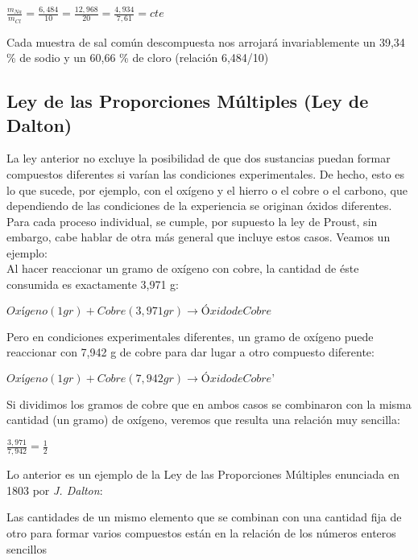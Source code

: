 \begin{center}
		$\frac{m_{Na}}{m_{Cl}}=\frac{6,484}{10}=\frac{12,968}{20}=\frac{4,934}{7,61}=cte$
\end{center}

Cada muestra de sal común descompuesta nos arrojará invariablemente un 39,34 \% de sodio y un 60,66 \% de cloro (relación 6,484/10)

\subsection{Ley de las Proporciones Múltiples (Ley de Dalton)}

La ley anterior no excluye la posibilidad de que dos sustancias puedan formar compuestos diferentes si varían las condiciones experimentales. De hecho, esto es lo que sucede, por ejemplo, con el oxígeno y el hierro o el cobre o el carbono, que dependiendo de las condiciones de la experiencia se originan óxidos diferentes. Para cada proceso individual, se cumple, por supuesto la ley de Proust, sin embargo, cabe hablar de otra más general que incluye estos casos. Veamos un ejemplo:\\

Al hacer reaccionar un gramo de oxígeno con cobre, la cantidad de éste consumida es exactamente 3,971 g:

\begin{center}
	$Oxígeno (1 gr) + Cobre  (3,971 gr) \rightarrow Óxido de Cobre
	$ 
\end{center}

Pero en condiciones experimentales diferentes, un gramo de oxígeno puede reaccionar con 7,942 g de cobre para dar lugar a otro compuesto diferente:

\begin{center}
	$Oxígeno (1 gr) + Cobre (7,942 gr) \rightarrow Óxido de Cobre’ $
\end{center}

Si dividimos los gramos de cobre que en ambos casos se combinaron con la misma cantidad (un gramo) de oxígeno, veremos que resulta una relación muy sencilla:

\begin{center}
	$\frac{3,971}{7,942}=\frac{1}{2}$
\end{center}

Lo anterior es un ejemplo de la Ley de las Proporciones Múltiples enunciada en 1803 por \emph{J. Dalton}:\\

\begin{law}
	Las cantidades de un mismo elemento que se combinan con una cantidad fija de otro para formar varios compuestos están en la relación de los números enteros sencillos
\end{law}


